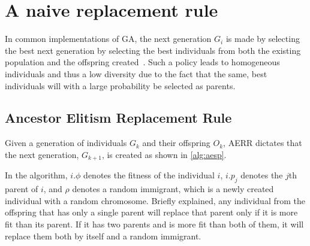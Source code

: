 \section{A naive replacement rule}
In common implementations of GA, the next generation $G_{i}$ is made by selecting the best  next generation by selecting the best individuals from both the existing population and the offspring created~. Such a policy leads to homogeneous individuals and thus a low diversity due to the fact that the same, best individuals will with a large probability be selected as parents.

\subsection{Ancestor Elitism Replacement Rule}
Given a generation of individuals $G_k$ and their offspring $O_k$, AERR dictates that the next generation, $G_{k+1}$, is created as shown in \cref{alg:aesp}.
%

%
In the algorithm, $i.\phi$ denotes the fitness of the individual $i$, $i.p_j$ denotes the $j$th parent of $i$, and $\rho$ denotes a random immigrant, which is a newly created individual with a random chromosome.
Briefly explained, any individual from the offspring that has only a single parent will replace that parent only if it is more fit than its parent. If it has two parents and is more fit than both of them, it will replace them both by itself and a random immigrant.
